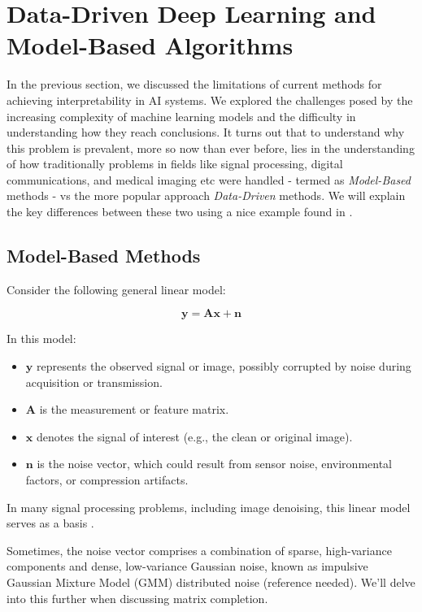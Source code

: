 \section{Data-Driven Deep Learning and Model-Based Algorithms}
In the previous section, we discussed the limitations of current methods for achieving interpretability in AI systems. We explored the challenges posed by the increasing complexity of machine learning models and the difficulty in understanding how they reach conclusions. It turns out that to understand why this problem is prevalent, more so now than ever before, lies in the understanding of how traditionally problems in fields like signal processing, digital communications, and medical imaging etc were handled - termed as \textit{Model-Based} methods - vs the more popular approach \textit{Data-Driven} methods. We will explain the key differences between these two using a nice example found in \cite{LUIJTEN2023677}. 

\subsection{Model-Based Methods}

Consider the following general linear model:

\begin{equation}
    \mathbf{y} = \mathbf{A}\mathbf{x} + \mathbf{n} \label{eq:1}
\end{equation}

In this model:
\begin{itemize}
    \item $\mathbf{y}$ represents the observed signal or image, possibly corrupted by noise during acquisition or transmission.
    \item $\mathbf{A}$ is the measurement or feature matrix.
    \item $\mathbf{x}$ denotes the signal of interest (e.g., the clean or original image).
    \item $\mathbf{n}$ is the noise vector, which could result from sensor noise, environmental factors, or compression artifacts.
\end{itemize}

In many signal processing problems, including image denoising, this linear model serves as a basis \cite{elad2023image}.

Sometimes, the noise vector comprises a combination of sparse, high-variance components and dense, low-variance Gaussian noise, known as impulsive Gaussian Mixture Model (GMM) distributed noise (reference needed). We'll delve into this further when discussing matrix completion.

